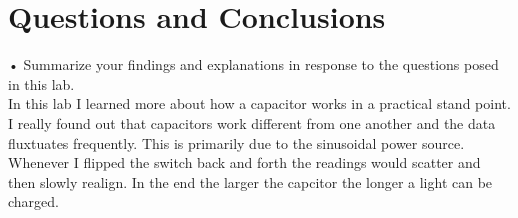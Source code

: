 \documentclass[a4paper]{article}
\begin{document}
\section*{Questions and Conclusions}
• Summarize your findings and explanations in response to the questions posed in this lab.  \\
In this lab I learned more about how a capacitor works in a practical stand point. I really found out that capacitors work different from one another and the data fluxtuates frequently. This is primarily due to the sinusoidal power source. Whenever I flipped the switch back and forth the readings would scatter and then slowly realign. In the end the larger the capcitor the longer a light can be charged.
\end{document}
